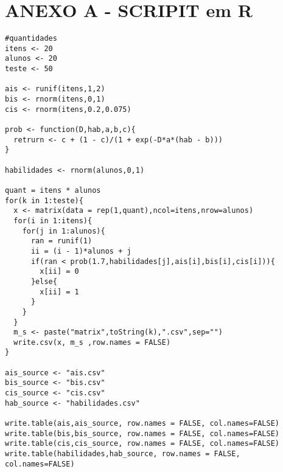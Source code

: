 	\section{ANEXO A - SCRIPIT em R} \nonumber
\begin{verbatim}
#quantidades
itens <- 20
alunos <- 20
teste <- 50

ais <- runif(itens,1,2)
bis <- rnorm(itens,0,1)
cis <- rnorm(itens,0.2,0.075)

prob <- function(D,hab,a,b,c){
  retrurn <- c + (1 - c)/(1 + exp(-D*a*(hab - b)))
}

habilidades <- rnorm(alunos,0,1)

quant = itens * alunos
for(k in 1:teste){
  x <- matrix(data = rep(1,quant),ncol=itens,nrow=alunos)
  for(i in 1:itens){
    for(j in 1:alunos){
      ran = runif(1)
      ii = (i - 1)*alunos + j
      if(ran < prob(1.7,habilidades[j],ais[i],bis[i],cis[i])){
        x[ii] = 0
      }else{
        x[ii] = 1
      }
    }
  }
  m_s <- paste("matrix",toString(k),".csv",sep="")
  write.csv(x, m_s ,row.names = FALSE)
}

ais_source <- "ais.csv"
bis_source <- "bis.csv"
cis_source <- "cis.csv"
hab_source <- "habilidades.csv"

write.table(ais,ais_source, row.names = FALSE, col.names=FALSE)
write.table(bis,bis_source, row.names = FALSE, col.names=FALSE)
write.table(cis,cis_source, row.names = FALSE, col.names=FALSE)
write.table(habilidades,hab_source, row.names = FALSE, col.names=FALSE)


\end{verbatim}
